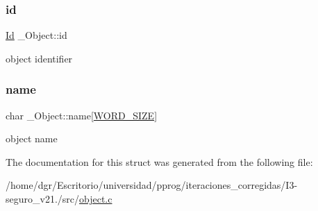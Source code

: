 \subsubsection{\texorpdfstring{id}{id}}
{\footnotesize\ttfamily \hyperlink{types_8h_a845e604fb28f7e3d97549da3448149d3}{Id} \+\_\+\+Object\+::id}

object identifier \mbox{\label{struct__Object_a3dab853826b88558a2c07dec50b96d57}} 
\subsubsection{\texorpdfstring{name}{name}}
{\footnotesize\ttfamily char \+\_\+\+Object\+::name\mbox{[}\hyperlink{types_8h_a92ed8507d1cd2331ad09275c5c4c1c89}{W\+O\+R\+D\+\_\+\+S\+I\+ZE}\mbox{]}}

object name 

The documentation for this struct was generated from the following file\+:\begin{DoxyCompactItemize}
\item 
/home/dgr/\+Escritorio/universidad/pprog/iteraciones\+\_\+corregidas/\+I3-\/seguro\+\_\+v21./src/\hyperlink{object_8c}{object.\+c}\end{DoxyCompactItemize}
